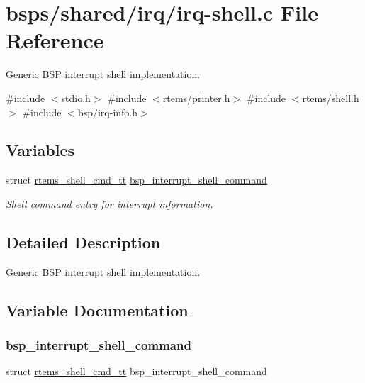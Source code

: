 \hypertarget{irq-shell_8c}{}\section{bsps/shared/irq/irq-\/shell.c File Reference}
\label{irq-shell_8c}


Generic B\+SP interrupt shell implementation.  


{\ttfamily \#include $<$stdio.\+h$>$}\newline
{\ttfamily \#include $<$rtems/printer.\+h$>$}\newline
{\ttfamily \#include $<$rtems/shell.\+h$>$}\newline
{\ttfamily \#include $<$bsp/irq-\/info.\+h$>$}\newline
\subsection*{Variables}
\begin{DoxyCompactItemize}
\item 
struct \mbox{\hyperlink{structrtems__shell__cmd__tt}{rtems\+\_\+shell\+\_\+cmd\+\_\+tt}} \mbox{\hyperlink{irq-shell_8c_a6546f4911a46df70d9af2f495c2e6c79}{bsp\+\_\+interrupt\+\_\+shell\+\_\+command}}
\begin{DoxyCompactList}\small\item\em Shell command entry for interrupt information. \end{DoxyCompactList}\end{DoxyCompactItemize}


\subsection{Detailed Description}
Generic B\+SP interrupt shell implementation. 



\subsection{Variable Documentation}
\mbox{\label{irq-shell_8c_a6546f4911a46df70d9af2f495c2e6c79}} 
\subsubsection{\texorpdfstring{bsp\_interrupt\_shell\_command}{bsp\_interrupt\_shell\_command}}
{\footnotesize\ttfamily struct \mbox{\hyperlink{structrtems__shell__cmd__tt}{rtems\+\_\+shell\+\_\+cmd\+\_\+tt}} bsp\+\_\+interrupt\+\_\+shell\+\_\+command}

